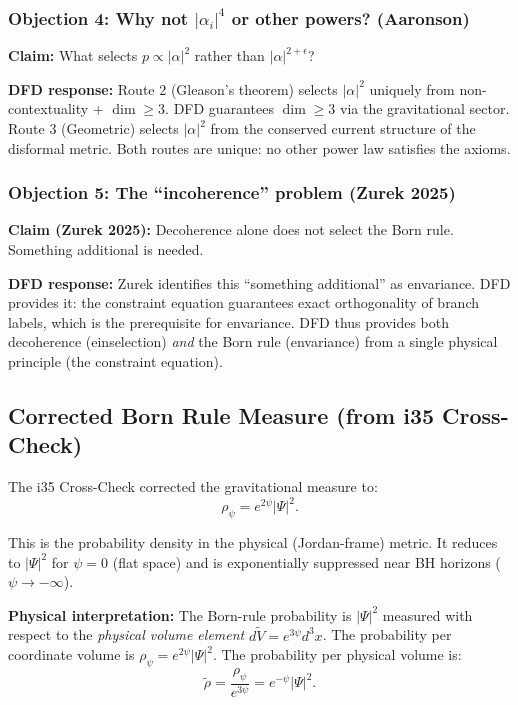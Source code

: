 \documentclass[11pt,a4paper]{article}
\begin{document}
\subsubsection{Objection 4: Why not $|\alpha_i|^4$ or other powers? (Aaronson)}

\textbf{Claim:} What selects $p \propto |\alpha|^2$ rather than $|\alpha|^{2+\epsilon}$?

\textbf{DFD response:} Route 2 (Gleason's theorem) selects $|\alpha|^2$ uniquely from non-contextuality + $\dim \geq 3$. DFD guarantees $\dim \geq 3$ via the gravitational sector. Route 3 (Geometric) selects $|\alpha|^2$ from the conserved current structure of the disformal metric. Both routes are unique: no other power law satisfies the axioms.

\subsubsection{Objection 5: The ``incoherence'' problem (Zurek 2025)}

\textbf{Claim (Zurek 2025):} Decoherence alone does not select the Born rule. Something additional is needed.

\textbf{DFD response:} Zurek identifies this ``something additional'' as envariance. DFD provides it: the constraint equation guarantees exact orthogonality of branch labels, which is the prerequisite for envariance. DFD thus provides both decoherence (einselection) \emph{and} the Born rule (envariance) from a single physical principle (the constraint equation).

\subsection{Corrected Born Rule Measure (from i35 Cross-Check)}

The i35 Cross-Check corrected the gravitational measure to:
\begin{equation}
\boxed{\rho_\psi = e^{2\psi}|\Psi|^2.}
\end{equation}

This is the probability density in the physical (Jordan-frame) metric. It reduces to $|\Psi|^2$ for $\psi = 0$ (flat space) and is exponentially suppressed near BH horizons ($\psi \to -\infty$).

\textbf{Physical interpretation:} The Born-rule probability is $|\Psi|^2$ measured with respect to the \emph{physical volume element} $d\tilde{V} = e^{3\psi}d^3x$. The probability per coordinate volume is $\rho_\psi = e^{2\psi}|\Psi|^2$. The probability per physical volume is:
\begin{equation}
\tilde\rho = \frac{\rho_\psi}{e^{3\psi}} = e^{-\psi}|\Psi|^2.
\end{equation}
\end{document}
